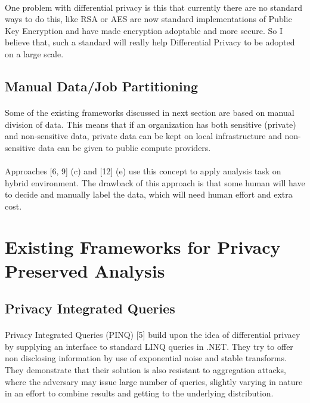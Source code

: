 \documentclass{report}
\begin{document}
\paragraph{}
One problem with differential privacy is this that currently there are no standard ways to do this, like RSA or AES are now standard implementations of Public Key Encryption and have made encryption adoptable and more secure. So I believe that, such a standard will really help Differential Privacy to be adopted on a large scale.
\subsection{Manual Data/Job Partitioning}
\paragraph{}
Some of the existing frameworks discussed in next section are based on manual division of data. This means that if an organization has both sensitive (private) and non-sensitive data, private data can be kept on local infrastructure and non-sensitive data can be given to public compute providers.
\paragraph{}
Approaches [6, 9] (c) and [12] (e) use this concept to apply analysis task on hybrid environment.
The drawback of this approach is that some human will have to decide and manually label the data, which will need human effort and extra cost.



\section{Existing Frameworks for Privacy Preserved Analysis}
\subsection{Privacy Integrated Queries}
\paragraph{}
Privacy Integrated Queries (PINQ) [5] build upon the idea of differential privacy by supplying an interface to standard LINQ queries in .NET. They try to offer non disclosing information by use of exponential noise and stable transforms. They demonstrate that their solution is also resistant to aggregation attacks, where the adversary may issue large number of queries, slightly varying in nature in an effort to combine results and getting to the underlying distribution.
\end{document}
